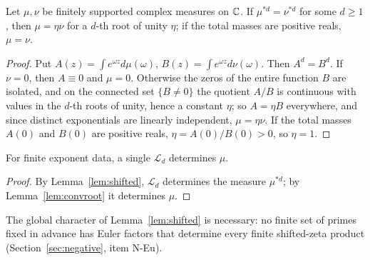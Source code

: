 \begin{lemma}\label{lem:convroot}
Let $\mu,\nu$ be finitely supported complex measures on $\mathbb{C}$. If $\mu^{*d}=\nu^{*d}$ for some $d\ge1$, then $\mu=\eta\nu$ for a $d$-th root of unity $\eta$; if the total masses are positive reals, $\mu=\nu$.
\end{lemma}

\begin{proof}
Put $A(z)=\int e^{\omega z}d\mu(\omega)$, $B(z)=\int e^{\omega z}d\nu(\omega)$. Then $A^d=B^d$. If $\nu=0$, then $A\equiv0$ and $\mu=0$. Otherwise the zeros of the entire function $B$ are isolated, and on the connected set $\{B\ne0\}$ the quotient $A/B$ is continuous with values in the $d$-th roots of unity, hence a constant $\eta$; so $A=\eta B$ everywhere, and since distinct exponentials are linearly independent, $\mu=\eta\nu$. If the total masses $A(0)$ and $B(0)$ are positive reals, $\eta=A(0)/B(0)>0$, so $\eta=1$.
\end{proof}

\begin{corollary}
For finite exponent data, a single $\mathcal{L}_d$ determines $\mu$.
\end{corollary}

\begin{proof}
By Lemma~\ref{lem:shifted}, $\mathcal{L}_d$ determines the measure $\mu^{*d}$; by Lemma~\ref{lem:convroot} it determines $\mu$.
\end{proof}

The global character of Lemma~\ref{lem:shifted} is necessary: no finite set of primes fixed in advance has Euler factors that determine every finite shifted-zeta product (Section~\ref{sec:negative}, item N-Eu).
